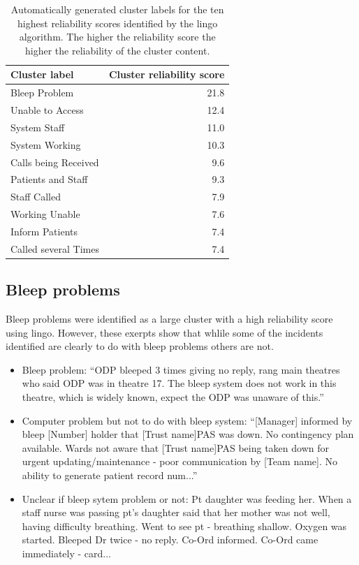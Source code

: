 \begin{table}[htbp]\centering
\begin{tabular}{lr}
\toprule
\textbf{Cluster label} & \textbf{Cluster reliability score} \\
\midrule
Bleep Problem & 21.8 \\ 
Unable to Access & 12.4 \\ 
System Staff & 11.0 \\ 
System Working & 10.3 \\ 
Calls being Received & 9.6 \\ 
Patients and Staff & 9.3 \\ 
Staff Called & 7.9 \\ 
Working Unable & 7.6 \\ 
Inform Patients & 7.4 \\ 
Called several Times & 7.4 \\ 
\bottomrule
\end{tabular}
\label{tab:lingo_topten_size}
\caption{Automatically generated cluster labels for the ten highest reliability scores identified by the lingo algorithm. The higher the reliability score the higher the reliability of the cluster content.}
\end{table}

\subsection{Bleep problems}
\label{bleepproblemexamples}

Bleep problems were identified as a large cluster with a high reliability score using lingo. However, these exerpts show that whlile some of the incidents identified are clearly to do with bleep problems others are not.

\begin{itemize}

 \item Bleep problem: ``ODP bleeped 3 times giving no reply, rang main theatres who said ODP was in theatre 17. The bleep system does not work in this theatre, which is widely known, expect the ODP was unaware of this.''

 \item Computer problem but not to do with bleep system:
``[Manager] informed by bleep [Number] holder that [Trust name]PAS was down. No contingency plan available. Wards not aware that [Trust name]PAS being taken down for urgent updating/maintenance - poor communication by [Team name]. No ability to generate patient record num...''

 \item Unclear if bleep sytem problem or not:
 Pt daughter was feeding her. When a staff nurse was passing pt's daughter said that her mother was not well, having difficulty breathing. Went to see pt - breathing shallow. Oxygen was started. Bleeped Dr twice - no reply. Co-Ord informed. Co-Ord came immediately - card... 

\end{itemize}

